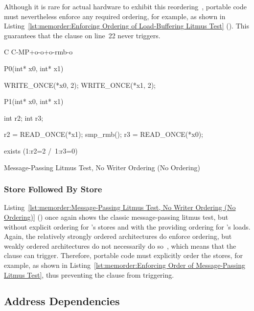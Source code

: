 Although it is rare for actual hardware to
exhibit this reordering~\cite{LucMaranget2017aarch64},
portable code must nevertheless enforce any required ordering, for example,
as shown in
Listing~\ref{lst:memorder:Enforcing Ordering of Load-Buffering Litmus Test}
().
This guarantees that the  clause on line~22 never triggers.

\begin{listing}[tbp]
{ \scriptsize
\begin{verbbox}[\LstLineNo]
C C-MP+o-o+o-rmb-o

{
}

P0(int* x0, int* x1) {

  WRITE_ONCE(*x0, 2);
  WRITE_ONCE(*x1, 2);

}

P1(int* x0, int* x1) {

  int r2;
  int r3;

  r2 = READ_ONCE(*x1);
  smp_rmb();
  r3 = READ_ONCE(*x0);

}

exists (1:r2=2 /\ 1:r3=0)
\end{verbbox}
}
\centering
\theverbbox
\caption{Message-Passing Litmus Test, No Writer Ordering (No Ordering)}
\label{lst:memorder:Message-Passing Litmus Test, No Writer Ordering (No Ordering)}
\end{listing}

\subsubsection{Store Followed By Store}
\label{sec:memorder:Store Followed By Store}

Listing~\ref{lst:memorder:Message-Passing Litmus Test, No Writer Ordering (No Ordering)}
()
once again shows the classic message-passing litmus test, but without
explicit ordering for 's stores and with the 
providing ordering for 's loads.
Again, the relatively strongly ordered architectures do enforce ordering,
but weakly ordered architectures do not necessarily do
so~\cite{JadeAlglave2011ppcmem}, which means that the
 clause can trigger.
Therefore, portable code must explicitly order the stores, for
example, as shown in
Listing~\ref{lst:memorder:Enforcing Order of Message-Passing Litmus Test},
thus preventing the  clause from triggering.

\subsection{Address Dependencies}
\label{sec:memorder:Address Dependencies}

